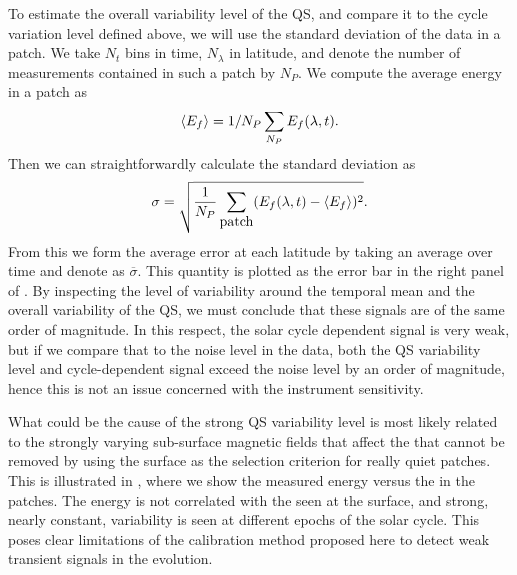\documentclass{aa}
\begin{document}
To estimate 
the overall variability level of the QS, and compare it to the cycle variation level defined above,
we will use the standard deviation of the data in a patch.
We take $N_t$ bins in time, $N_\lambda$ in latitude, and denote the number of \ef measurements contained in such a patch by $N_P$. We compute the average \fff energy in a patch as
\begin{equation}
\langle E_f \rangle=1/N_P \sum_{N_P} E_f (\lambda,t).
\end{equation}
Then we can straightforwardly calculate the standard deviation as
\begin{equation}
\sigma= \sqrt{\frac{1}{N_P}\sum_{\mbox{patch}} ( E_f(\lambda,t)
- \left<{E_f} \right>)^2}.
\end{equation}
From this we form the average error at each latitude by taking an average over time and denote as $\overline{\sigma}$. 
This quantity is plotted as the error bar in the right panel of 
.
By inspecting the level of variability around the temporal mean and the 
overall variability of the QS, we must conclude that these signals are of the same order of magnitude. 
In this respect, the solar cycle dependent signal is very weak, but if we compare that to the noise level in the data, both the QS variability level and cycle-dependent signal exceed the noise level by an order of magnitude, hence this is not an issue concerned with the instrument sensitivity.

What could be the cause of the strong QS variability level is most likely related to the strongly varying sub-surface magnetic fields that affect the \fff that cannot be removed by using the surface \brms{} as the selection criterion for really quiet patches. This is illustrated in , where we show the measured \fff energy versus the \brms{} in the patches. The \fff energy is not correlated with the \brms{} seen at the surface, and strong, nearly constant, variability is seen at different epochs of the solar cycle. This poses clear limitations of the calibration method proposed here to detect weak transient signals in the \fff evolution.
\end{document}
